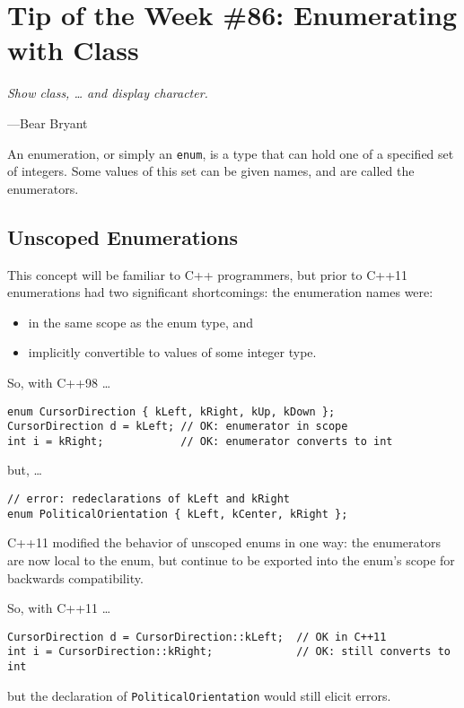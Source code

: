 
\chapter{Tip of the Week \#86: Enumerating with Class}\label{ch:tip-of-the-week-86}

\epigraph{\itshape Show class, … and display character.}{---Bear Bryant}

An enumeration, or simply an \texttt{enum}, is a type that can hold one of a specified set of integers. Some values of this set can be given names, and are called the enumerators.

\section{Unscoped Enumerations}\label{sec:unscoped-enumerations}
This concept will be familiar to C++ programmers, but prior to C++11 enumerations had two significant shortcomings: the enumeration names were:
\begin{itemize}
    \item in the same scope as the enum type, and
    \item implicitly convertible to values of some integer type.
\end{itemize}

So, with C++98 …
\begin{verbatim}
enum CursorDirection { kLeft, kRight, kUp, kDown };
CursorDirection d = kLeft; // OK: enumerator in scope
int i = kRight;            // OK: enumerator converts to int
\end{verbatim}
but, …
\begin{verbatim}
// error: redeclarations of kLeft and kRight
enum PoliticalOrientation { kLeft, kCenter, kRight };
\end{verbatim}

C++11 modified the behavior of unscoped enums in one way: the enumerators are now local to the enum, but continue to be exported into the enum’s scope for backwards compatibility.

So, with C++11 …
\begin{verbatim}
CursorDirection d = CursorDirection::kLeft;  // OK in C++11
int i = CursorDirection::kRight;             // OK: still converts to int
\end{verbatim}
but the declaration of \texttt{PoliticalOrientation} would still elicit errors.

